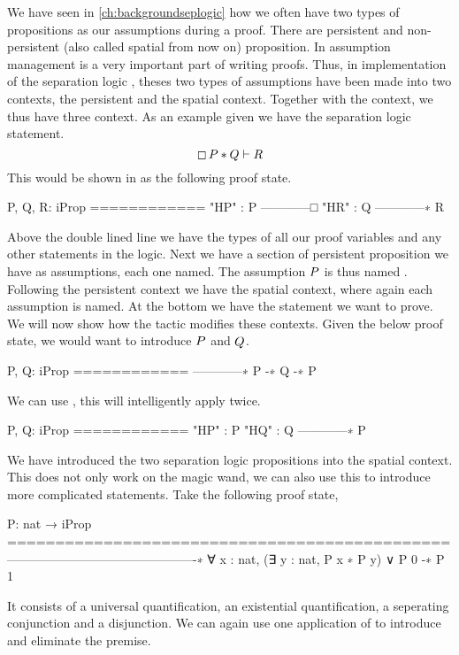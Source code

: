 \documentclass[thesis.tex]{subfiles}
\begin{document}
We have seen in \cref*{ch:backgroundseplogic} how we often have two types of propositions as our assumptions during a proof. There are persistent and non-persistent (also called spatial from now on) proposition. In \coq assumption management is a very important part of writing proofs. Thus, in \coq implementation of the separation logic \iris, theses two types of assumptions have been made into two contexts, the persistent and the spatial context. Together with the \coq context, we thus have three context. As an example given we have the separation logic statement.
\[ \mathop{\boxempty}P * Q \vdash R \]
This would be shown in \iris as the following proof state.
\begin{coqcode}
  P, Q, R: iProp
  ============
  "HP" : P
  ------------□
  "HR" : Q
  ------------∗
  R
\end{coqcode}
Above the double lined line we have the types of all our proof variables and any other statements in the \coq logic. Next we have a section of persistent proposition we have as assumptions, each one named. The assumption $P$ is thus named . Following the persistent context we have the spatial context, where again each assumption is named. At the bottom we have the statement we want to prove. We will now show how the  tactic modifies these contexts. Given the below proof state, we would want to introduce $P$ and $Q$.
\begin{coqcode}
  P, Q: iProp
  ============
  ------------∗
  P -∗ Q -∗ P
\end{coqcode}
We can use , this will intelligently apply  twice.
\begin{coqcode}
  P, Q: iProp
  ============
  "HP" : P
  "HQ" : Q
  ------------∗
  P
\end{coqcode}
We have introduced the two separation logic propositions into the spatial context. This does not only work on the magic wand, we can also use this to introduce more complicated statements. Take the following proof state,
\begin{coqcode}
  P: nat → iProp
  ==============================================
  ----------------------------------------------∗
  ∀ x : nat, (∃ y : nat, P x ∗ P y) ∨ P 0 -∗ P 1
\end{coqcode}
It consists of a universal quantification, an existential quantification, a seperating conjunction and a disjunction. We can again use one application of  to introduce and eliminate the premise.
\end{document}
